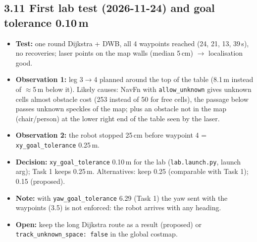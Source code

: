 \documentclass[10pt]{article}
\newcommand{\pkg}[1]{\texttt{#1}}
\begin{document}
\subsection*{3.11 First lab test (2026-11-24) and goal tolerance 0.10\,m}
\begin{itemize}
  \item \textbf{Test:} one round Dijkstra + DWB, all 4 waypoints reached (24, 21, 13, 39\,s), no recoveries; laser points on the map walls (median 5\,cm) $\rightarrow$ localisation good.
  \item \textbf{Observation 1:} leg 3$\rightarrow$4 planned around the top of the table (8.1\,m instead of $\approx$5\,m below it). Likely causes: NavFn with \pkg{allow\_unknown} gives unknown cells almost obstacle cost (253 instead of 50 for free cells), the passage below passes unknown speckles of the map; plus an obstacle not in the map (chair/person) at the lower right end of the table seen by the laser.
  \item \textbf{Observation 2:} the robot stopped 25\,cm before waypoint 4 = \pkg{xy\_goal\_tolerance} 0.25\,m.
  \item \textbf{Decision:} \pkg{xy\_goal\_tolerance} 0.10\,m for the lab (\pkg{lab.launch.py}, launch arg); Task 1 keeps 0.25\,m. Alternatives: keep 0.25 (comparable with Task 1); 0.15 (proposed).
  \item \textbf{Note:} with \pkg{yaw\_goal\_tolerance} 6.29 (Task 1) the yaw sent with the waypoints (3.5) is not enforced: the robot arrives with any heading.
  \item \textbf{Open:} keep the long Dijkstra route as a result (proposed) or \pkg{track\_unknown\_space: false} in the global costmap.
\end{itemize}
\end{document}
